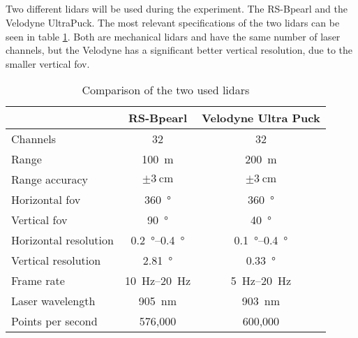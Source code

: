 \subsection{}
Two different \acrshort{lidar}s will be used during the experiment.
The RS-Bpearl and the Velodyne UltraPuck.
The most relevant specifications of the two \acrshort{lidar}s can be seen in table \ref{tab:lidar_datasheets}.
Both are mechanical \acrshort{lidar}s and have the same number of laser channels, but the Velodyne has a significant better vertical resolution, due to the smaller vertical \acrshort{fov}.
\begin{table}[ht]
	\centering
	\caption{Comparison of the two used \acrshort{lidar}s \cite{RoboSense2020}\cite{Rev}}
	\label{tab:lidar_datasheets}
	\begin{tabular}[t]{lcc}
	\toprule
	&\textbf{RS-Bpearl} & \textbf{Velodyne Ultra Puck}\\
	\midrule
	Channels 				& 32 							& 32\\
	Range 					& \SI{100}{\metre}				& \SI{200}{\metre}\\
	Range accuracy			& $\pm\SI{3}{\centi\metre}$		& $\pm\SI{3}{\centi\metre}$\\
	Horizontal \acrshort{fov}		 	& \SI{360}{\degree}				& \SI{360}{\degree}\\
	Vertical \acrshort{fov} 			& \SI{90}{\degree}				& \SI{40}{\degree}\\
	Horizontal resolution	& \SIrange{0.2}{0.4}{\degree} 	& \SIrange{0.1}{0.4}{\degree}\\
	Vertical resolution		& \SI{2.81}{\degree} 			& \SI{0.33}{\degree}\\
	Frame rate 				& \SIrange{10}{20}{\hertz}		& \SIrange{5}{20}{\hertz}\\
	Laser wavelength 		& \SI{905}{\nano\metre} 		& \SI{903}{\nano\metre}\\
	Points per second 		& 576,000						& 600,000		\\
	\bottomrule
	\end{tabular}
	\end{table}%



